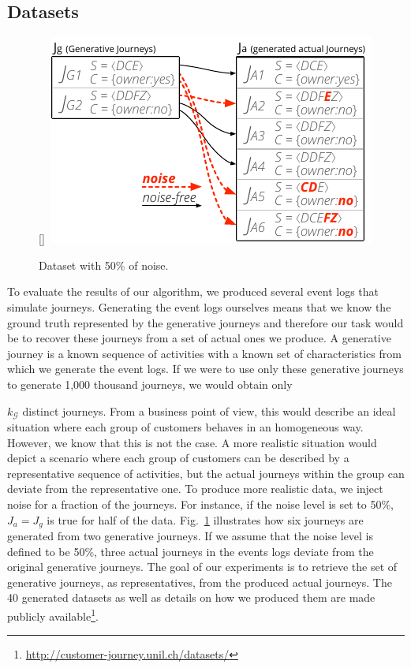 \documentclass[runningheads]{llncs}
\begin{document}
{\subsection{Datasets}


\begin{figure}
  \begin{center}
    \raisebox{0pt}[\dimexpr{}\baselineskip\relax]{\
\includegraphics[width=0.42\columnwidth]{05_schema/dataset.pdf}
    }
  \end{center}
  \vspace{-5pt}
  \caption{Dataset with 50\% of noise.}
  \label{fig:dataset}
\end{figure} 


To evaluate the results of our algorithm, we produced several event logs that simulate journeys. Generating the event logs ourselves means that we know the ground truth represented by the generative journeys and therefore our task would be to recover these journeys from a set of actual ones we produce. A generative journey is a known sequence of activities with a known set of characteristics from which we generate the event logs. If we were to use only these generative journeys to generate 1,000 thousand journeys, we would obtain only {$k_{\mathcal{G}}$ distinct journeys. From a business point of view, this would describe an ideal situation where each group of customers behaves in an homogeneous way. However, we know that this is not the case. A more realistic situation would depict a scenario where each group of customers can be described by a representative sequence of activities, but the actual journeys within the group can deviate from the representative one. To produce more realistic data, we inject noise for a fraction of the journeys. For instance, if the noise level is set to 50\%, $J_a = J_g$ is true for half of the data. Fig.~\ref{fig:dataset} illustrates how six journeys are generated from two generative journeys. If we assume that the noise level is defined to be 50\%, three actual journeys in the events logs deviate from the original generative journeys. The goal of our experiments is to retrieve the set of generative journeys, as representatives, from the produced actual journeys. The 40 generated datasets as well as details on how we produced them are made publicly available\footnote{\url{http://customer-journey.unil.ch/datasets/}}.

}}
\end{document}
